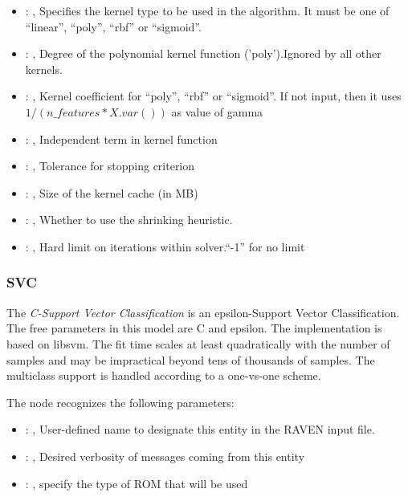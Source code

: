 \begin{itemize}
    \item {}: ,
      Specifies the kernel type to be used in the algorithm. It must be one of
      ``linear'', ``poly'', ``rbf'' or ``sigmoid''.

    \item {}: ,
      Degree of the polynomial kernel function ('poly').Ignored by all other kernels.

    \item {}: ,
      Kernel coefficient for ``poly'', ``rbf'' or ``sigmoid''. If not input, then it uses
      $1 / (n\_features * X.var())$ as value of gamma

    \item {}: ,
      Independent term in kernel function

    \item {}: ,
      Tolerance for stopping criterion

    \item {}: ,
      Size of the kernel cache (in MB)

    \item {}: ,
      Whether to use the shrinking heuristic.

    \item {}: ,
      Hard limit on iterations within solver.``-1'' for no limit
  \end{itemize}


\subsubsection{SVC}
  The  \textit{C-Support Vector Classification} is an epsilon-Support Vector
  Classification.                             The free parameters in this model are C and epsilon.
  The implementation is based on libsvm. The fit time scales at least
  quadratically with the number of samples and may be impractical                             beyond
  tens of thousands of samples. The multiclass support is handled according to a one-vs-one scheme.

  The  node recognizes the following parameters:
    \begin{itemize}
      \item {}: ,
        User-defined name to designate this entity in the RAVEN input file.
      \item {}: ,
        Desired verbosity of messages coming from this entity
      \item {}: ,
        specify the type of ROM that will be used
  \end{itemize}

